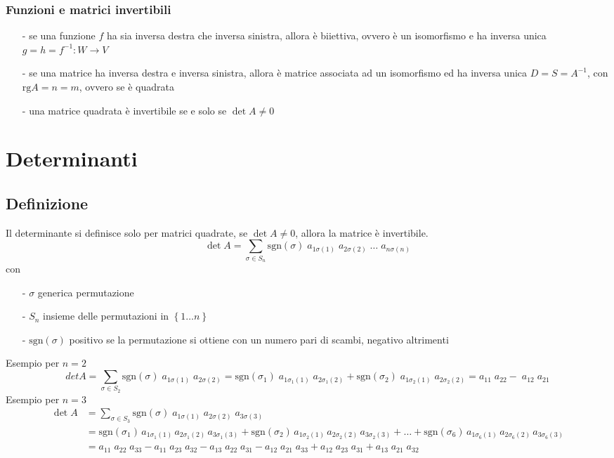 \documentclass[a4paper]{article}
\newcommand\rg{\text{rg}} 		%
\newcommand\sgn{\text{sgn}}		%
\begin{document}
\subsubsection*{Funzioni e matrici invertibili}
\begin{itemize}[topsep=3pt, itemsep=0pt]
	\item[-] se una funzione \(f\) ha sia inversa destra che inversa sinistra, allora è biiettiva, ovvero è un isomorfismo e ha
	inversa unica \(g = h = f^{-1} : W \to V\)
	\item[-] se una matrice ha inversa destra e inversa sinistra, allora è matrice associata ad un isomorfismo ed ha inversa unica
	\(D = S = A^{-1}\), con \(\rg A = n = m\), ovvero se è quadrata
	\item[-] una matrice quadrata è invertibile se e solo se \(\det A \neq 0\)
\end{itemize}

\newpage

\section{Determinanti}
\subsection{Definizione}
Il determinante si definisce solo per matrici quadrate, se \(\det A \neq 0\), allora la matrice è invertibile.
\[\det A = \sum_{\sigma \in S_n} \sgn(\sigma) \; a_{1\sigma(1)} \; a_{2\sigma(2)} \; \dots \; a_{n\sigma(n)}\]
con \begin{itemize}[topsep=3pt, itemsep=0pt]
	\item[-] \(\sigma\) generica permutazione
	\item[-] \(S_n\) insieme delle permutazioni in \(\left\{ 1 \dots n \right\}\)
	\item[-] \(\sgn(\sigma)\) positivo se la permutazione si ottiene con un numero pari di scambi, negativo altrimenti
\end{itemize}
Esempio per \(n = 2\)
\[det A = \sum_{\sigma \in S_2} \sgn(\sigma) \; a_{1 \sigma(1)} \; a_{2 \sigma(2)} = \sgn(\sigma_1) \; a_{1 \sigma_1(1)} \; a_{2 \sigma_1(2)} + \sgn(\sigma_2) \; a_{1 \sigma_2(1)} \; a_{2 \sigma_2(2)} = a_{11} \; a_{22} -\; a_{12} \; a_{21}\]
Esempio per \(n = 3\)
\begin{align*}
	\det A &= \sum_{\sigma \in S_3} \sgn(\sigma) \; a_{1 \sigma(1)} \; a_{2 \sigma(2)} \; a_{3 \sigma(3)} \\
	&= \sgn(\sigma_1) \, a_{1 \sigma_1(1)} \, a_{2 \sigma_1(2)} \, a_{3 \sigma_1(3)} + \sgn(\sigma_2) \, a_{1 \sigma_2(1)} \, a_{2 \sigma_2(2)} \, a_{3 \sigma_2(3)} + \dots + \sgn(\sigma_6) \, a_{1 \sigma_6(1)} \, a_{2 \sigma_6(2)} \, a_{3 \sigma_6(3)} \\
	&= a_{11} \; a_{22} \; a_{33} - a_{11} \; a_{23} \; a_{32} - a_{13} \; a_{22} \; a_{31} - a_{12} \; a_{21} \; a_{33} + a_{12} \; a_{23} \; a_{31} + a_{13} \; a_{21} \; a_{32}
\end{align*}
\end{document}
